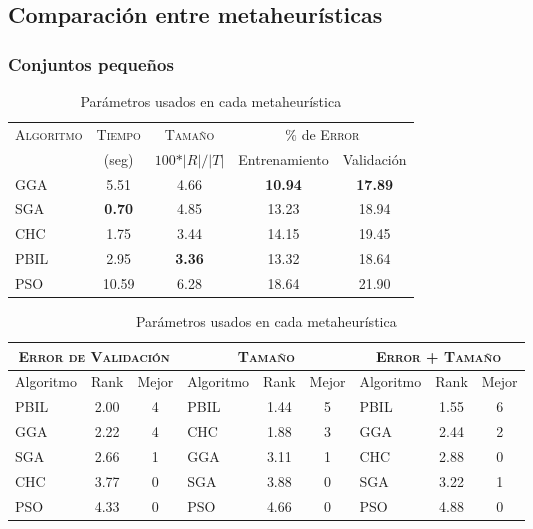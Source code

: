 \blindtext

\subsection{Comparación entre metaheurísticas}

\blindtext

\subsubsection{Conjuntos pequeños}

\blindtext

\begin{table}[h!]
\centering
\begin{tabular}{l c c c c}
\hline
\multirow{2}{*}{\textsc{Algoritmo}}
	& \textsc{Tiempo} & \textsc{Tamaño}
	& \multicolumn{2}{c}{$\%$ de \textsc{Error}} \\\cline{4-5}
 & \scriptsize{(seg)} & \scriptsize{$100*\vert R \vert / \vert T \vert$}
	& \scriptsize{Entrenamiento} & \scriptsize{Validación} \\
\hline
\hline
GGA  &  5.51 & 4.66 & \textbf{10.94} & \textbf{17.89} \\
SGA  & \textbf{0.70} & 4.85 & 13.23 & 18.94 \\
CHC  &  1.75 & 3.44 & 14.15 & 19.45 \\
PBIL &  2.95 & \textbf{3.36} & 13.32 & 18.64 \\
PSO  & 10.59 & 6.28 & 18.64 & 21.90 \\
\hline
\end{tabular}
\caption{Parámetros usados en cada metaheurística}
\label{res-small}
\end{table}

\blindtext

\begin{table}[h!]
\centering
\begin{tabular}{l c c|l c c|l c c}
\hline
\multicolumn{3}{c|}{\textsc{Error de Validación}}
	& \multicolumn{3}{c|}{\textsc{Tamaño}}
	& \multicolumn{3}{c}{\textsc{Error + Tamaño}} \\
\hline
Algoritmo & Rank & Mejor & Algoritmo & Rank & Mejor & Algoritmo & Rank & Mejor \\
\hline
\hline
PBIL & 2.00 & 4 & PBIL & 1.44 & 5 & PBIL & 1.55 & 6 \\
GGA  & 2.22 & 4 & CHC  & 1.88 & 3 & GGA  & 2.44 & 2 \\
SGA  & 2.66 & 1 & GGA  & 3.11 & 1 & CHC  & 2.88 & 0 \\
CHC  & 3.77 & 0 & SGA  & 3.88 & 0 & SGA  & 3.22 & 1 \\
PSO  & 4.33 & 0 & PSO  & 4.66 & 0 & PSO  & 4.88 & 0 \\
\hline
\end{tabular}
\caption{Parámetros usados en cada metaheurística}
\label{res-small-rank}
\end{table}

